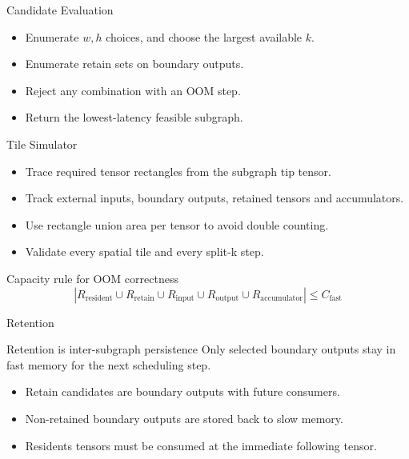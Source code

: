 \documentclass[aspectratio=169,professionalfonts]{beamer}
\begin{document}
\begin{frame}{Candidate Evaluation}
\begin{center}
\end{center}
\begin{itemize}
\item Enumerate \(w,h\) choices, and choose the largest available \(k\).
\item Enumerate retain sets on boundary outputs.
\item Reject any combination with an OOM step.
\item Return the lowest-latency feasible subgraph.
\end{itemize}
\end{frame}

\begin{frame}{Tile Simulator}
\begin{itemize}
\item Trace required tensor rectangles from the subgraph tip tensor.
\item Track external inputs, boundary outputs, retained tensors and accumulators.
\item Use rectangle union area per tensor to avoid double counting.
\item Validate every spatial tile and every split-k step.
\end{itemize}
\begin{block}{Capacity rule for OOM correctness}
\[
|R_{\text{resident}}\cup R_{\text{retain}}\cup
R_{\text{input}}\cup R_{\text{output}}\cup R_{\text{accumulator}}|
\leq C_{\text{fast}}
\]
\end{block}
\end{frame}


\begin{frame}{Retention}
\begin{block}{Retention is inter-subgraph persistence}
Only selected boundary outputs stay in fast memory for the next scheduling step.
\end{block}
\begin{itemize}
\item Retain candidates are boundary outputs with future consumers.
\item Non-retained boundary outputs are stored back to slow memory.
\item Residents tensors must be consumed at the immediate following tensor.
\end{itemize}
\end{frame}
\end{document}
